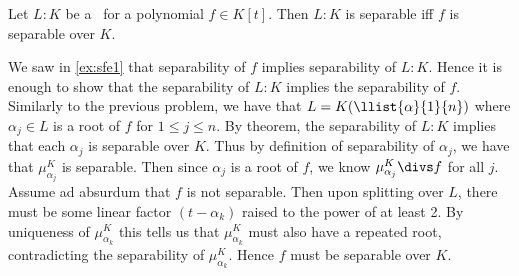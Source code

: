 \documentclass{article}
\begin{document}
\begin{exercise}
  Let \( L:K \) be a \sfe~for a polynomial \( f\in K[t] \).
  Then \( L:K \) is separable iff \( f \) is separable over \( K \).
\end{exercise}
\begin{solution}
  We saw in \ref{ex:sfe1} that separability of \( f \) implies separability of \( L:K \).
  Hence it is enough to show that the separability of \( L:K \) implies the separability of \( f \).
  Similarly to the previous problem, we have that \( L=K(\llist{\alpha}{1}{n}) \) where \( \alpha_j\in L \) is a root of \( f \) for \( 1\leq j\leq n \).
  By theorem, the separability of \( L:K \) implies that each \( \alpha_j \) is separable over \( K \).
  Thus by definition of separability of \( \alpha_j \), we have that \( \mu_{\alpha_j}^K \) is separable.
  Then since \( \alpha_j \) is a root of \( f \), we know \( \mu_{\alpha_j}^K \divs f \) for all \( j \).
  Assume ad absurdum that \( f \) is not separable.
  Then upon splitting over \( L \), there must be some linear factor \( (t-\alpha_k) \) raised to the power of at least 2.
  By uniqueness of \( \mu_{\alpha_k}^K \) this tells us that \( \mu_{\alpha_k}^K \) must also have a repeated root, contradicting the separability of \( \mu_{\alpha_k}^K \).
  Hence \( f \) must be separable over \( K \).
\end{solution}
\end{document}
